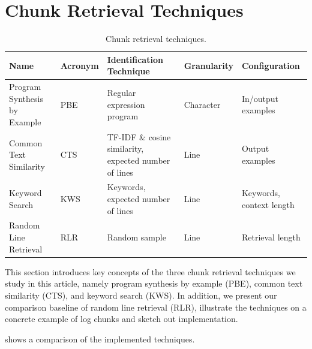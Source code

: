 
\section{Chunk Retrieval Techniques}
\label{sec:techniques}

\begin{table}[htb]
\centering
\caption{Chunk retrieval techniques.}
\begin{tabularx}{\textwidth}{@{}llXll@{}}
\toprule
Name			     & Acronym & Identification Technique
& Granularity & Configuration \\
\midrule
Program Synthesis by Example & PBE     & Regular expression program
& Character   & In/output examples	\\
Common Text Similarity	     & CTS     & TF-IDF \& cosine similarity,
expected number of lines & Line        & Output examples	   \\
Keyword Search		     & KWS     & Keywords, expected number of
lines			 & Line        & Keywords, context length  \\
Random Line Retrieval	     & RLR     & Random sample
& Line	      & Retrieval length	  \\
\bottomrule
\end{tabularx}
\label{tab:ctr}
\end{table}

This section introduces key concepts of the three chunk retrieval
techniques we study in this article, namely program synthesis by
example (PBE), common text similarity (CTS), and keyword search (KWS).
In addition, we present our comparison baseline of random line
retrieval (RLR), illustrate the techniques on a concrete example
of log chunks and sketch out implementation.

 shows a comparison of the implemented techniques.


